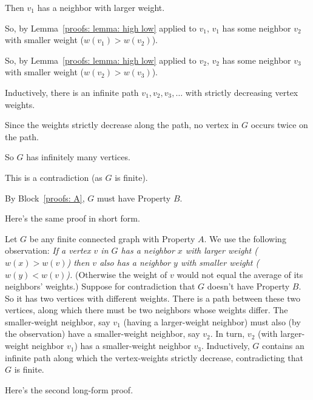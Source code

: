 \begin{longFormProof}
\begin{block}[proofs: A]
    \step Then $v_1$ has a neighbor with larger weight.

    \step So, by Lemma~\ref{proofs: lemma: high low} applied to $v_1$,
    $v_1$ has some neighbor $v_2$ with smaller weight ($w(v_1) > w(v_2)$).

    \step So, by Lemma~\ref{proofs: lemma: high low} applied to $v_2$,
    $v_2$ has some neighbor $v_3$ with smaller weight ($w(v_2) > w(v_3)$).

    \step Inductively, there is an infinite path
    $v_1, v_2, v_3, \ldots$ with strictly decreasing vertex weights.

    \step Since the weights strictly decrease along the path, no vertex in $G$ occurs twice on the path.

    \step So $G$ has infinitely many vertices.

    \step This is a contradiction (as $G$ is finite).  
  \end{block}
  \step By Block~\ref{proofs: A}, $G$ must have Property $B$.
\end{longFormProof}

Here's the same proof in short form.

\begin{shortFormProof}
  Let $G$ be any finite connected graph with Property $A$.
  We use the following observation:
  \emph{If a vertex $v$ in $G$ has a neighbor $x$ with larger weight ($w(x) > w(v)$)
    then $v$ also has a neighbor $y$ with smaller weight ($w(y) < w(v)$).}
  (Otherwise the weight of $v$ would not equal the average of its neighbors' weights.)
  Suppose for contradiction that $G$ doesn't have Property $B$.
  So it has two vertices with different weights.
  There is a path between these two vertices,
  along which there must be two neighbors whose weights differ.
  The smaller-weight neighbor, say $v_1$
  (having a larger-weight neighbor)
  must also (by the observation) have a smaller-weight neighbor, say $v_2$.
  In turn, $v_2$ (with larger-weight neighbor $v_1$)
  has a smaller-weight neighbor $v_3$.
  Inductively,
  $G$ contains an infinite path
  along which the vertex-weights strictly decrease,
  contradicting that $G$ is finite.
\end{shortFormProof}


Here's the second long-form proof.

